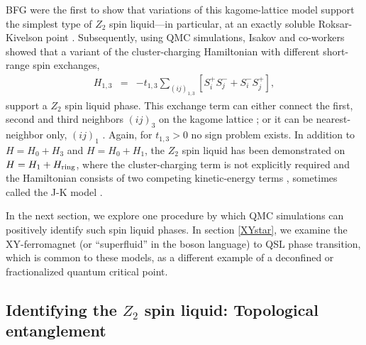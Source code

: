 \documentclass[10pt,pre,aps,twocolumn,showpacs,subscriptaddresses,floatfix]{revtex4}
\begin{document}
BFG \cite{BFG} were the first to show that variations of this kagome-lattice model support the simplest type of $Z_2$ spin liquid---in particular, at an exactly soluble Roksar-Kivelson point \cite{Rokhsar88}.  Subsequently, using QMC simulations, Isakov and co-workers showed that a variant of the cluster-charging Hamiltonian with different short-range spin exchanges, 
\begin{eqnarray}
H_{1,3} &=& -t_{1,3} \sum_{( ij )_{1,3}} [S^{+}_i S^-_j + S^-_i S^{+}_j],  
\end{eqnarray}
support a $Z_2$ spin liquid phase.  This exchange term can either connect the first, second and third neighbors $( ij )_3$ on the kagome lattice \cite{Isakov1,Isakov2}; or it can be nearest-neighbor only, $(ij)_1$ \cite{TopoEE}.  Again, for $t_{1,3}>0$ no sign problem exists. 
In addition to  $H = H_0 + H_3$ and $H = H_0 + H_1$, the $Z_2$ spin liquid has been demonstrated on $H = H_1 + H_{\rm ring}$, where the cluster-charging term is not explicitly required and the Hamiltonian consists of two competing kinetic-energy terms \cite{Long}, sometimes called the J-K model \cite{JKqmc}.



In the next section, we explore one procedure by which QMC simulations can positively identify such spin liquid phases.  In section \ref{XYstar}, we examine the XY-ferromagnet (or ``superfluid'' in the boson language) to QSL phase transition, which is common to these models, as a different example of a deconfined or fractionalized quantum critical point.

\subsection{Identifying the $Z_2$ spin liquid: Topological entanglement} 
\label{topoEEsec}
\end{document}
